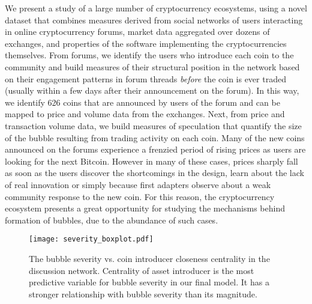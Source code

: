 We present a study of a large number of cryptocurrency ecosystems, 
using a novel dataset that combines measures derived from social networks of users interacting in online cryptocurrency forums, market data aggregated over dozens of exchanges, and properties of the software implementing the cryptocurrencies themselves.
From forums, we identify the users who introduce each coin to the community and build measures of their structural position in the network based on
their engagement patterns in forum threads \emph{before} the coin is ever traded (usually within a few days after their announcement on the forum).
In this way, we identify 626 coins that are announced by users of the forum and can be mapped to price and volume data from the exchanges.
Next, from price and transaction volume data, we build measures of speculation that quantify the size of the bubble resulting from trading activity on each coin. 
Many of the new coins announced on the forums experience a frenzied period of rising prices as users are looking for the next Bitcoin. However in many of these cases, prices sharply fall as soon as the users discover the shortcomings in the design, learn about the lack of real innovation or simply because first adapters observe about a weak community response to the new coin. For this reason, the cryptocurrency ecosystem presents a great opportunity for studying the mechanisms behind formation of bubbles, due to the abundance of such cases.



\begin{figure}
\centering
\texttt{[image: severity\_boxplot.pdf]}
\caption{The bubble severity vs. coin introducer closeness centrality in the discussion network. Centrality of asset introducer is the most predictive variable for bubble severity in our final model. It has a stronger relationship with bubble severity than its magnitude.}
\label{severity_boxplot}
\end{figure}


